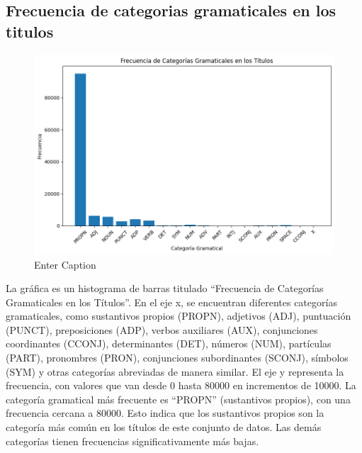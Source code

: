 \documentclass[conference]{IEEEtran}
\begin{document}
\subsection{Frecuencia de categorias gramaticales en los titulos}
\begin{figure}[H]
    \centering
    \includegraphics[width=1\linewidth]{mapaTitulos.png}
    \caption{Enter Caption}
    \label{fig:enter-label}
\end{figure}

La gráfica es un histograma de barras titulado “Frecuencia de Categorías Gramaticales en los Títulos”.
En el eje x, se encuentran diferentes categorías gramaticales, como sustantivos propios (PROPN), adjetivos (ADJ), puntuación (PUNCT), preposiciones (ADP), verbos auxiliares (AUX), conjunciones coordinantes (CCONJ), determinantes (DET), números (NUM), partículas (PART), pronombres (PRON), conjunciones subordinantes (SCONJ), símbolos (SYM) y otras categorías abreviadas de manera similar.
El eje y representa la frecuencia, con valores que van desde 0 hasta 80000 en incrementos de 10000.
La categoría gramatical más frecuente es “PROPN” (sustantivos propios), con una frecuencia cercana a 80000. Esto indica que los sustantivos propios son la categoría más común en los títulos de este conjunto de datos. Las demás categorías tienen frecuencias significativamente más bajas.
\end{document}
